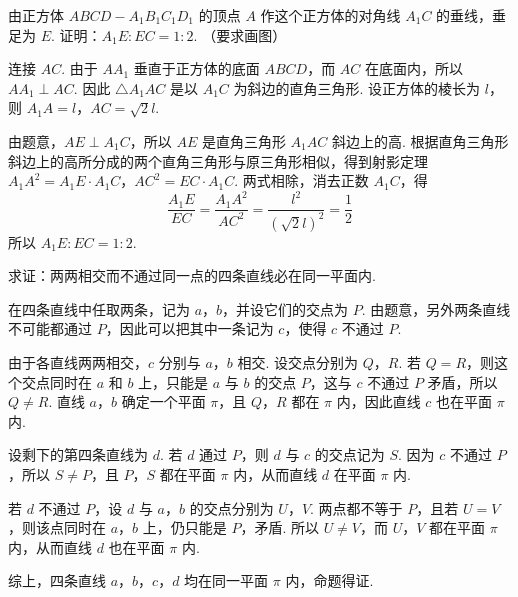 \documentclass[UTF8,a4paper,oneside,11pt]{ctexbook}
\begin{document}
\begin{problem}
由正方体 \(ABCD-A_1B_1C_1D_1\) 的顶点 \(A\) 作这个正方体的对角线 \(A_1C\) 的垂线，垂足为 \(E\). 证明：\(A_1E:EC=1:2\). （要求画图）
\end{problem}

\begin{solution}
连接 \(AC\). 由于 \(AA_1\) 垂直于正方体的底面 \(ABCD\)，而 \(AC\) 在底面内，所以 \(AA_1\perp AC\). 因此 \(\triangle A_1AC\) 是以 \(A_1C\) 为斜边的直角三角形. 设正方体的棱长为 \(l\)，则
\(A_1A=l\)，\(AC=\sqrt2l\).


由题意，\(AE\perp A_1C\)，所以 \(AE\) 是直角三角形 \(A_1AC\) 斜边上的高. 根据直角三角形斜边上的高所分成的两个直角三角形与原三角形相似，得到射影定理
\(A_1A^2=A_1E\cdot A_1C\)，\(AC^2=EC\cdot A_1C\).
两式相除，消去正数 \(A_1C\)，得
\[
\frac{A_1E}{EC}=\frac{A_1A^2}{AC^2}=\frac{l^2}{\left(\sqrt2l\right)^2}=\frac12
\]
所以 \(A_1E:EC=1:2\).
\end{solution}

\begin{problem}
求证：两两相交而不通过同一点的四条直线必在同一平面内.
\end{problem}

\begin{solution}
在四条直线中任取两条，记为 \(a\)，\(b\)，并设它们的交点为 \(P\). 由题意，另外两条直线不可能都通过 \(P\)，因此可以把其中一条记为 \(c\)，使得 \(c\) 不通过 \(P\).

由于各直线两两相交，\(c\) 分别与 \(a\)，\(b\) 相交. 设交点分别为 \(Q\)，\(R\). 若 \(Q=R\)，则这个交点同时在 \(a\) 和 \(b\) 上，只能是 \(a\) 与 \(b\) 的交点 \(P\)，这与 \(c\) 不通过 \(P\) 矛盾，所以 \(Q\neq R\). 直线 \(a\)，\(b\) 确定一个平面 \(\pi\)，且 \(Q\)，\(R\) 都在 \(\pi\) 内，因此直线 \(c\) 也在平面 \(\pi\) 内.

设剩下的第四条直线为 \(d\). 若 \(d\) 通过 \(P\)，则 \(d\) 与 \(c\) 的交点记为 \(S\). 因为 \(c\) 不通过 \(P\)，所以 \(S\neq P\)，且 \(P\)，\(S\) 都在平面 \(\pi\) 内，从而直线 \(d\) 在平面 \(\pi\) 内.

若 \(d\) 不通过 \(P\)，设 \(d\) 与 \(a\)，\(b\) 的交点分别为 \(U\)，\(V\). 两点都不等于 \(P\)，且若 \(U=V\)，则该点同时在 \(a\)，\(b\) 上，仍只能是 \(P\)，矛盾. 所以 \(U\neq V\)，而 \(U\)，\(V\) 都在平面 \(\pi\) 内，从而直线 \(d\) 也在平面 \(\pi\) 内.

综上，四条直线 \(a\)，\(b\)，\(c\)，\(d\) 均在同一平面 \(\pi\) 内，命题得证.
\end{solution}

\end{document}
